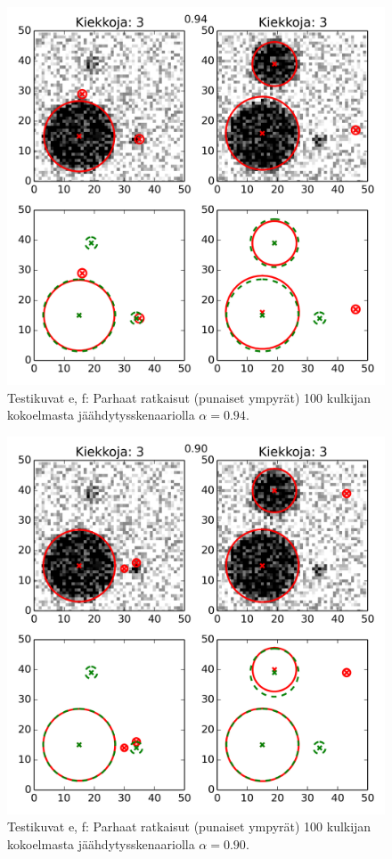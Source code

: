 \begin{figure}[htpb]
    \centering
    \includegraphics[width=0.7\linewidth]{figures/set3_datasets_res_094.png}
    \caption{
        Testikuvat e, f: Parhaat ratkaisut (punaiset ympyrät) 100 kulkijan kokoelmasta jäähdytysskenaariolla $\alpha = 0.94$.
        \label{fig:set3_datasets_res_094}
    }
\end{figure}


\begin{figure}[htpb]
    \centering
    \includegraphics[width=0.7\linewidth]{figures/set3_datasets_res_090.png}
    \caption{
        Testikuvat e, f: Parhaat ratkaisut (punaiset ympyrät) 100 kulkijan kokoelmasta jäähdytysskenaariolla $\alpha = 0.90$.
        \label{fig:set3_datasets_res_090}
    }
\end{figure}


